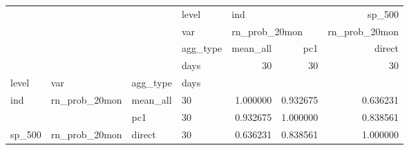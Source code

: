 \begin{tabular}{llllrrr}
\toprule
       &               &        & level & \multicolumn{2}{l}{ind} &        sp\_500 \\
       &               &        & var & \multicolumn{2}{l}{rn\_prob\_20mon} & rn\_prob\_20mon \\
       &               &        & agg\_type &      mean\_all &       pc1 &        direct \\
       &               &        & days &            30 &        30 &            30 \\
level & var & agg\_type & days &               &           &               \\
\midrule
ind & rn\_prob\_20mon & mean\_all & 30 &      1.000000 &  0.932675 &      0.636231 \\
       &               & pc1 & 30 &      0.932675 &  1.000000 &      0.838561 \\
sp\_500 & rn\_prob\_20mon & direct & 30 &      0.636231 &  0.838561 &      1.000000 \\
\bottomrule
\end{tabular}
